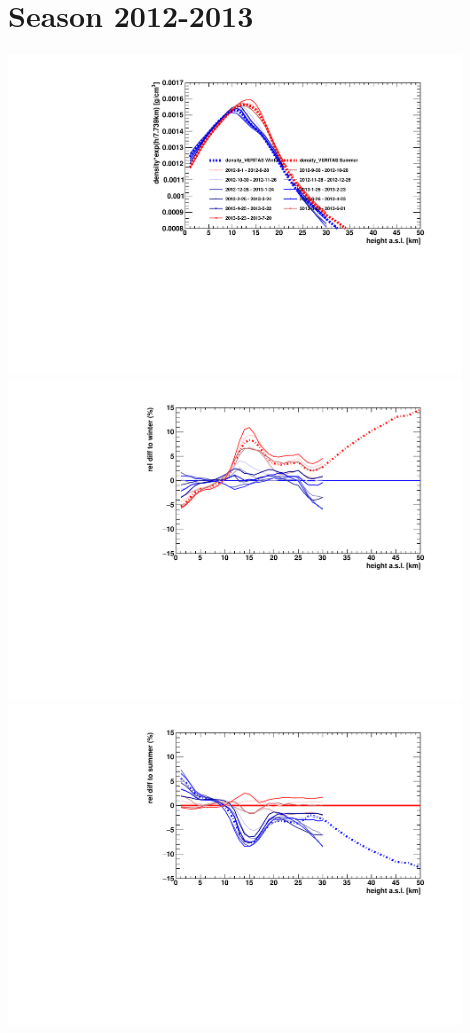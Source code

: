 \section*{Season 2012-2013}
\noindent\begin{minipage}{\textwidth}
\centering
\includegraphics[width=0.9\textwidth]{season-2012-2013-density.pdf}
\includegraphics[width=0.9\textwidth]{season-relativeWinter-2012-2013-density.pdf}
\includegraphics[width=0.9\textwidth]{season-relativeSummer-2012-2013-density.pdf}
\end{minipage}
